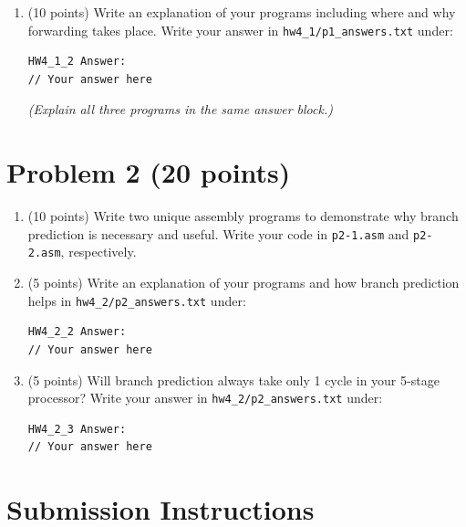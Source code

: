 \documentclass[12pt]{article}
\begin{document}
\begin{enumerate}
It is fine if your tests contain other instructions (e.g., LBI to initialize registers, HALT to stop the program,
and NOPs to test various pipeline stalls, forwarding cases, or branch cases), but each of your tests must
include its assigned target instruction.

\item (10 points)
Write an explanation of your programs including where and why forwarding takes place.
Write your answer in \texttt{hw4\_1/p1\_answers.txt} under:
\begin{verbatim}
HW4_1_2 Answer:
// Your answer here
\end{verbatim}
\textit{(Explain all three programs in the same answer block.)}
\end{enumerate}

\section*{Problem 2 (20 points)}
\begin{enumerate}
\item (10 points) Write two unique assembly programs to demonstrate why branch prediction is necessary and
useful. Write your code in \texttt{p2-1.asm} and \texttt{p2-2.asm}, respectively.
\item (5 points) Write an explanation of your programs and how branch prediction helps in \texttt{hw4\_2/p2\_answers.txt} under:
\begin{verbatim}
HW4_2_2 Answer:
// Your answer here
\end{verbatim}
\item (5 points) Will branch prediction always take only 1 cycle in your 5-stage processor? Write your answer
in \texttt{hw4\_2/p2\_answers.txt} under:
\begin{verbatim}
HW4_2_3 Answer:
// Your answer here
\end{verbatim}
\end{enumerate}

\section*{Submission Instructions}
\end{document}
